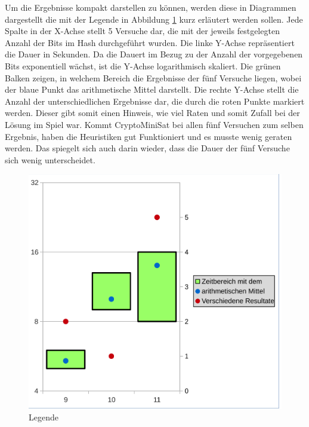 Um die Ergebnisse kompakt darstellen zu können, werden diese in Diagrammen dargestellt die mit der Legende in Abbildung \ref{fig:data_lengede}
kurz erläutert werden sollen. Jede Spalte in der X-Achse stellt 5 Versuche dar, die mit der jeweils festgelegten Anzahl der Bits im Hash
durchgeführt wurden. Die linke Y-Achse repräsentiert die Dauer in Sekunden. Da die Dauert im Bezug zu der Anzahl der vorgegebenen Bits exponentiell
wächst, ist die Y-Achse logarithmisch skaliert. Die grünen Balken zeigen, in welchem Bereich die Ergebnisse der fünf Versuche liegen, wobei
der blaue Punkt das arithmetische Mittel darstellt. Die rechte Y-Achse stellt die Anzahl der unterschiedlichen Ergebnisse dar, die durch die
roten Punkte markiert werden. Dieser gibt somit einen Hinweis, wie viel Raten und somit Zufall bei der Lösung im Spiel war. Kommt CryptoMiniSat
bei allen fünf Versuchen zum selben Ergebnis, haben die Heuristiken gut Funktioniert und es musste wenig geraten werden. Das spiegelt sich auch
darin wieder, dass die Dauer der fünf Versuche sich wenig unterscheidet.
\begin{figure}[!h]
  \centering
  \includegraphics[scale=0.55]{images/data_legend}
  \caption{Legende}
  \label{fig:data_lengede}
\end{figure}

